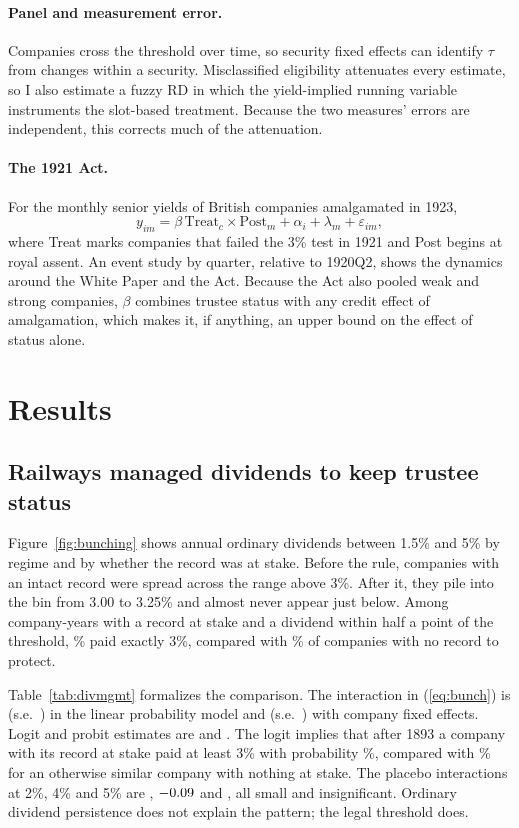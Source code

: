 \documentclass[11pt]{article}
\begin{document}
\paragraph{Panel and measurement error.} Companies cross the threshold over time, so security fixed effects can identify $\tau$ from changes within a security. Misclassified eligibility attenuates every estimate, so I also estimate a fuzzy RD in which the yield-implied running variable instruments the slot-based treatment. Because the two measures' errors are independent, this corrects much of the attenuation.

\paragraph{The 1921 Act.} For the monthly senior yields of British companies amalgamated in 1923,
\begin{equation}\label{eq:did}
y_{im} = \beta\,\text{Treat}_c \times \text{Post}_m + \alpha_i + \lambda_m + \varepsilon_{im},
\end{equation}
where Treat marks companies that failed the 3\% test in 1921 and Post begins at royal assent. An event study by quarter, relative to 1920Q2, shows the dynamics around the White Paper and the Act. Because the Act also pooled weak and strong companies, $\beta$ combines trustee status with any credit effect of amalgamation, which makes it, if anything, an upper bound on the effect of status alone.

\section{Results}\label{sec:results}

\subsection{Railways managed dividends to keep trustee status}

Figure~\ref{fig:bunching} shows annual ordinary dividends between 1.5\% and 5\% by regime and by whether the record was at stake. Before the rule, companies with an intact record were spread across the range above 3\%. After it, they pile into the bin from 3.00 to 3.25\% and almost never appear just below. Among company-years with a record at stake and a dividend within half a point of the threshold, \exactStake\% paid exactly 3\%, compared with \exactNot\% of companies with no record to protect.

Table~\ref{tab:divmgmt} formalizes the comparison. The interaction in (\ref{eq:bunch}) is \lpmInt{} (s.e.\ \lpmIntSE) in the linear probability model and \lpmfeInt{} (s.e.\ \lpmfeIntSE) with company fixed effects. Logit and probit estimates are \logitInt{} and \probitInt{}. The logit implies that after 1893 a company with its record at stake paid at least 3\% with probability \ppStake\%, compared with \ppNot\% for an otherwise similar company with nothing at stake. The placebo interactions at 2\%, 4\% and 5\% are \placTwo{}, $-0.09$ and \placFive{}, all small and insignificant. Ordinary dividend persistence does not explain the pattern; the legal threshold does.
\end{document}
